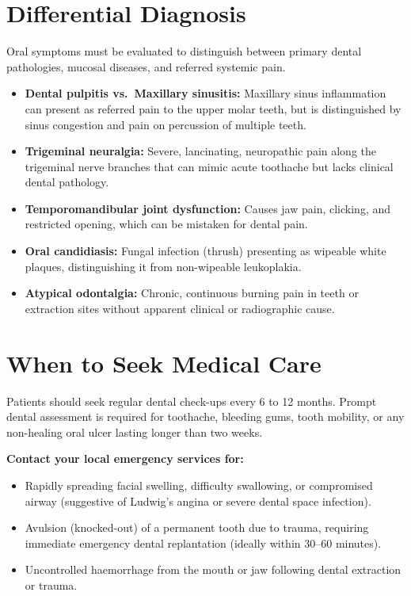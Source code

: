 \section*{Differential Diagnosis}
Oral symptoms must be evaluated to distinguish between primary dental pathologies, mucosal diseases, and referred systemic pain.
\begin{itemize}
    \item \textbf{Dental pulpitis vs.\ Maxillary sinusitis:} Maxillary sinus inflammation can present as referred pain to the upper molar teeth, but is distinguished by sinus congestion and pain on percussion of multiple teeth.
    \item \textbf{Trigeminal neuralgia:} Severe, lancinating, neuropathic pain along the trigeminal nerve branches that can mimic acute toothache but lacks clinical dental pathology.
    \item \textbf{Temporomandibular joint dysfunction:} Causes jaw pain, clicking, and restricted opening, which can be mistaken for dental pain.
    \item \textbf{Oral candidiasis:} Fungal infection (thrush) presenting as wipeable white plaques, distinguishing it from non-wipeable leukoplakia.
    \item \textbf{Atypical odontalgia:} Chronic, continuous burning pain in teeth or extraction sites without apparent clinical or radiographic cause.
\end{itemize}

\section*{When to Seek Medical Care}
Patients should seek regular dental check-ups every 6 to 12 months. Prompt dental assessment is required for toothache, bleeding gums, tooth mobility, or any non-healing oral ulcer lasting longer than two weeks.

\textbf{Contact your local emergency services for:}
\begin{itemize}
    \item Rapidly spreading facial swelling, difficulty swallowing, or compromised airway (suggestive of Ludwig's angina or severe dental space infection).
    \item Avulsion (knocked-out) of a permanent tooth due to trauma, requiring immediate emergency dental replantation (ideally within 30--60 minutes).
    \item Uncontrolled haemorrhage from the mouth or jaw following dental extraction or trauma.
\end{itemize}


